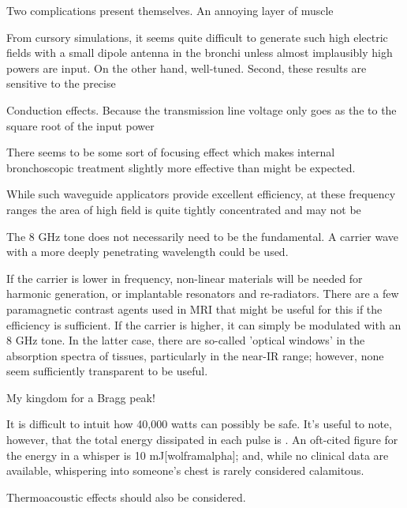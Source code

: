 \documentclass[paper.tex]{subfiles}
\begin{document}
Two complications present themselves. An annoying layer of muscle 


From cursory simulations, it seems quite difficult to generate such high electric fields with a small dipole antenna in the bronchi unless almost implausibly high powers are input. On the other hand, well-tuned. Second, these results are sensitive to the precise




Conduction effects. Because the transmission line voltage only goes as the to the square root of the input power

There seems to be some sort of focusing effect which makes internal bronchoscopic treatment slightly more effective than might be expected.


While such waveguide applicators provide excellent efficiency, at these frequency ranges the area of high field is quite tightly concentrated and may not be 



The 8 GHz tone does not necessarily need to be the fundamental. A carrier wave with a more deeply penetrating wavelength could be used. 

If the carrier is lower in frequency, non-linear materials\cite{Theory1973} will be needed for harmonic generation, or implantable resonators and re-radiators. There are a few paramagnetic contrast agents used in MRI that might be useful for this if the efficiency is sufficient. If the carrier is higher, it can simply be modulated with an 8 GHz tone. In the latter case, there are so-called 'optical windows' in the absorption spectra of tissues, particularly in the near-IR range; however, none seem sufficiently transparent to be useful.

My kingdom for a Bragg peak!



It is difficult to intuit how 40,000 watts can possibly be safe. It's useful to note, however, that the total energy dissipated in each pulse is . An oft-cited figure for the energy in a whisper is 10 mJ[wolframalpha]; and, while no clinical data are available, whispering into someone's chest is rarely considered calamitous.

Thermoacoustic effects should also be considered.



\clearpage
\printbibliography[heading=none, title={}, keyword={Flagship}]
\printbibliography[heading=none, title={}, keyword={standards}]
\end{document}
